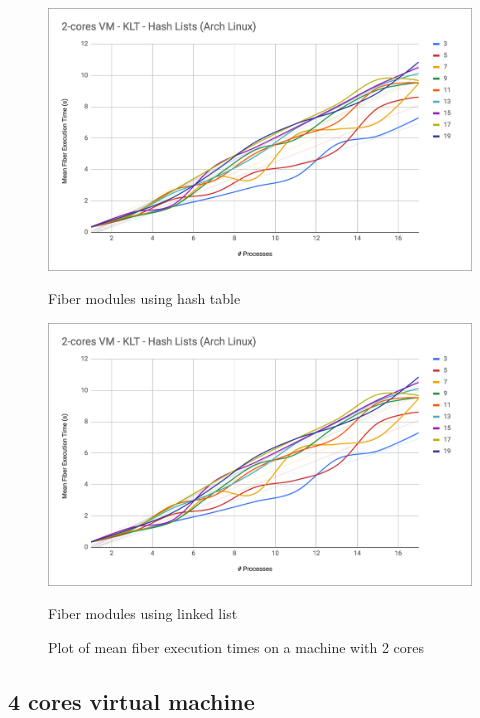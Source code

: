 \documentclass[a4paper,10pt]{article}
\begin{document}
 \begin{figure}[ht!]
   \centering
   \begin{minipage}{0.45\textwidth}%
     \centering
     \includegraphics[width=\textwidth]{imgs/bench-2cores-hash}
     \caption{Fiber modules using hash table}
     \label{fig:2figsA}
   \end{minipage}%
   \qquad
   \begin{minipage}{0.45\textwidth}%
     \centering
     \includegraphics[width=\textwidth]{imgs/bench-2cores-hash}
     \caption{Fiber modules using linked list}
     \label{fig:2figsB}%
   \end{minipage}%
   \caption{Plot of mean fiber execution times on a machine with 2 cores}
 \end{figure}


 \subsection{4 cores virtual machine}
\end{document}
